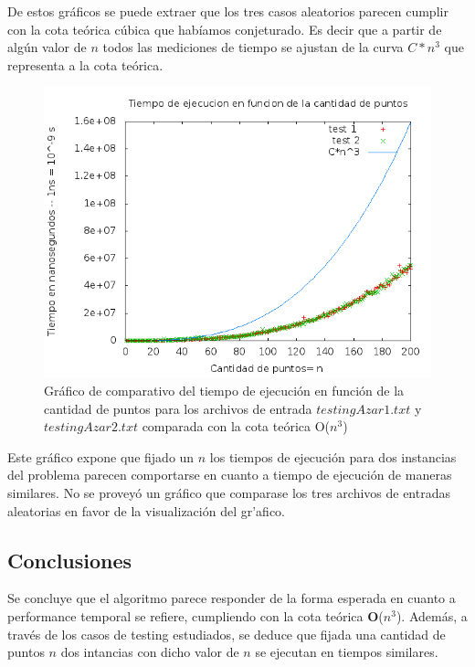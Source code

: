 \indent De estos gr\'aficos se puede extraer que los tres casos aleatorios parecen cumplir con la cota te\'orica c\'ubica que hab\'iamos conjeturado. Es decir que a partir de alg\'un valor de $n$ todos las mediciones de tiempo se ajustan de la curva $C*n^3$ que representa a la cota te\'orica.\\


\begin{figure}[H]
	\centering
	\includegraphics[scale=0.5]{ej3-compTestAzarEj3.png}
	\caption{ Gr\'afico de comparativo del tiempo de ejecuci\'on en funci\'on de la cantidad de puntos para los archivos de entrada $testingAzar1.txt$ y $testingAzar2.txt$ comparada con la cota te\'orica O($n^3$)}
\end{figure}

\indent Este gr\'afico expone que fijado un $n$ los tiempos de ejecuci\'on para dos instancias del problema parecen comportarse en cuanto a tiempo de ejecuci\'on de maneras similares. No se provey\'o un gr\'afico que comparase los tres archivos de entradas aleatorias en favor de la visualizaci\'on del gr'afico.\\

\subsection{Conclusiones}

\indent Se concluye que el algoritmo parece responder de la forma esperada en cuanto a performance temporal se refiere, cumpliendo con la cota te\'orica \textbf{O}($n^3$). Además, a trav\'es de los casos de testing estudiados, se deduce que fijada una cantidad de puntos $n$ dos intancias con dicho valor de $n$ se ejecutan en tiempos similares.\\ 


